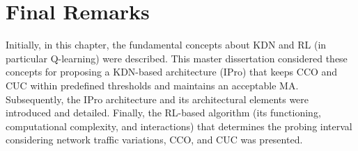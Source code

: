 \section{Final Remarks}
\label{sec:final_remarks_kap3}

Initially, in this chapter, the fundamental concepts about KDN and RL (in particular Q-learning)  were described. This master dissertation considered these concepts for proposing a KDN-based architecture (IPro) that keeps CCO and CUC within predefined thresholds and maintains an acceptable MA. Subsequently, the IPro architecture and its architectural elements were introduced and detailed. Finally, the RL-based algorithm (its functioning, computational complexity, and interactions) that determines the probing interval considering network traffic variations, CCO, and CUC was presented. 